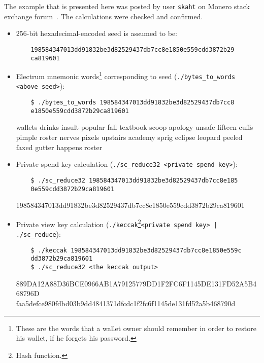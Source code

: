 The example that is presented here was posted by user \verb|skaht| on Monero stack exchange forum~\cite{stackexchange}. The calculations were checked and confirmed.
\begin{itemize}
  \item 256-bit hexadecimal-encoded seed is assumed to be:
  \begin{verbatim}
    198584347013dd91832be3d82529437db7cc8e1850e559cdd3872b29
    ca819601
  \end{verbatim}
  \item Electrum mnemonic words\footnote{These are the words that a wallet owner should remember in order to restore his wallet, if he forgets his password.} corresponding to seed (\verb|./bytes_to_words <above seed>|):
  \begin{verbatim}
    $ ./bytes_to_words 198584347013dd91832be3d82529437db7cc8
    e1850e559cdd3872b29ca819601
  \end{verbatim}
  \begin{tcolorbox}[colback=green!5!white,colframe=green!65!black,title=Output:]
    wallets drinks insult popular fall textbook scoop apology unsafe fifteen cuffs pimple roster nerves pixels upstairs academy sprig eclipse leopard peeled faxed gutter happens roster
  \end{tcolorbox}
  \item Private spend key calculation (\verb|./sc_reduce32 <private spend key>|):
  \begin{verbatim}
    $ ./sc_reduce32 198584347013dd91832be3d82529437db7cc8e185
    0e559cdd3872b29ca819601
  \end{verbatim}
  \begin{tcolorbox}[colback=green!5!white,colframe=green!65!black,title=Output:]
    \small{198584347013dd91832be3d82529437db7cc8e1850e559cdd3872b29ca819601}
  \end{tcolorbox}
  \item Private view key calculation (\verb|./keccak|\footnote{Hash function.}\verb=<private spend key> | ./sc_reduce=):
  \begin{verbatim}
    $ ./keccak 198584347013dd91832be3d82529437db7cc8e1850e559c
    dd3872b29ca819601
    $ ./sc_reduce32 <the keccak output>
  \end{verbatim}
  \begin{tcolorbox}[colback=green!5!white,colframe=green!65!black,title=Output:]
    \footnotesize{889DA12A88D36BCE0966AB1A79125779DD1F2FC6F1145DE131FD52A5B468796D}
    \tcblower
    \small{faa5defce980fdbd03b9dd4841371dfcdc1f2fc6f1145de131fd52a5b468790d}

\end{tcolorbox}
\end{itemize}
